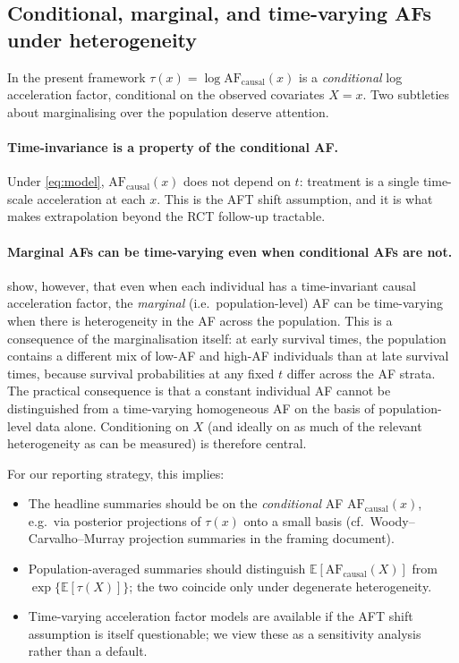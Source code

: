 \documentclass[11pt]{article}
\theoremstyle{plain}
\theoremstyle{definition}
\theoremstyle{remark}
\newcommand{\1}{\mathds{1}}
\newcommand{\tauf}{\tau}
\newcommand{\AF}{\mathrm{AF}}
\begin{document}
\subsection{Conditional, marginal, and time-varying AFs under heterogeneity}

In the present framework $\tauf(x) = \log\AF_{\mathrm{causal}}(x)$ is a
\emph{conditional} log acceleration factor, conditional on the observed
covariates $X = x$. Two subtleties about marginalising over the
population deserve attention.

\paragraph{Time-invariance is a property of the conditional AF.}
Under \eqref{eq:model}, $\AF_{\mathrm{causal}}(x)$ does not depend on $t$:
treatment is a single time-scale acceleration at each $x$. This is the
AFT shift assumption, and it is what makes extrapolation beyond the RCT
follow-up tractable.

\paragraph{Marginal AFs can be time-varying even when conditional AFs
are not.}
\citet{Brathovde2024} show, however, that even when each individual has
a time-invariant causal acceleration factor, the \emph{marginal} (i.e.\
population-level) AF can be time-varying when there is heterogeneity in
the AF across the population. This is a consequence of the marginalisation
itself: at early survival times, the population contains a different mix
of low-AF and high-AF individuals than at late survival times, because
survival probabilities at any fixed $t$ differ across the AF strata. The
practical consequence is that a constant individual AF cannot be
distinguished from a time-varying homogeneous AF on the basis of
population-level data alone. Conditioning on $X$ (and ideally on as much
of the relevant heterogeneity as can be measured) is therefore central.

For our reporting strategy, this implies:
\begin{itemize}[leftmargin=*]
  \item The headline summaries should be on the \emph{conditional} AF
        $\AF_{\mathrm{causal}}(x)$, e.g.\ via posterior projections of
        $\tauf(x)$ onto a small basis (cf.\ Woody--Carvalho--Murray
        projection summaries in the framing document).
  \item Population-averaged summaries should distinguish
        $\mathbb{E}[\AF_{\mathrm{causal}}(X)]$ from
        $\exp\{\mathbb{E}[\tauf(X)]\}$; the two coincide only under
        degenerate heterogeneity.
  \item Time-varying acceleration factor models
        \citep{Crowther2023, pang2021flexible} are available if the AFT shift
        assumption is itself questionable; we view these as a sensitivity
        analysis rather than a default.
\end{itemize}
\end{document}
